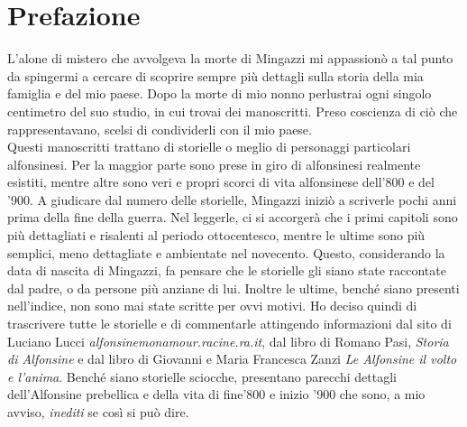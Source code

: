 
\chapter*{Prefazione}
L'alone di mistero che avvolgeva la morte di Mingazzi mi appassionò a tal punto da spingermi a cercare di scoprire sempre più dettagli sulla storia della mia famiglia e del mio paese. Dopo la morte di mio nonno perlustrai ogni singolo centimetro del suo studio, in cui trovai dei manoscritti. Preso coscienza di ciò che rappresentavano, scelsi di condividerli con il mio paese.
\\Questi manoscritti trattano di storielle o meglio di personaggi particolari alfonsinesi. Per la maggior parte sono prese in giro di alfonsinesi realmente esistiti, mentre altre sono veri e propri scorci di vita alfonsinese dell'800 e del '900. A giudicare dal numero delle storielle, Mingazzi iniziò a scriverle pochi anni prima della fine della guerra. Nel leggerle, ci si accorgerà che i primi capitoli sono più dettagliati e risalenti al periodo ottocentesco, mentre le ultime sono più semplici, meno dettagliate e ambientate nel novecento. Questo, considerando la data di nascita di Mingazzi, fa pensare che le storielle gli siano state raccontate dal padre, o da persone più anziane di lui. Inoltre le ultime, benché siano presenti nell'indice, non sono mai state scritte per ovvi motivi. Ho deciso quindi di trascrivere tutte le storielle e di commentarle attingendo informazioni dal sito di Luciano Lucci \emph{alfonsinemonamour.racine.ra.it}, dal libro di Romano Pasi, \emph{Storia di Alfonsine} e dal libro di Giovanni e Maria Francesca Zanzi \emph{Le Alfonsine il volto e l'anima}. Benché siano storielle sciocche, presentano parecchi dettagli dell'Alfonsine prebellica e della vita di fine'800 e inizio '900 che sono, a mio avviso, \emph{inediti} se così si può dire.
